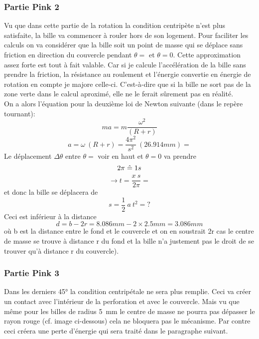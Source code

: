 \subsubsection{Partie Pink 2}
Vu que dans cette partie de la rotation la condition centripète n'est plus satisfaite, la bille va commencer à rouler hors de son logement. Pour faciliter les calculs on va considérer que la bille soit un point de masse qui se déplace sans friction en direction du couvercle pendant $\theta = $%
et $\theta = 0$. 
Cette approximation assez forte est tout à fait valable. Car si je calcule l'accélération de la bille sans prendre la friction, la résistance au roulement et l'énergie convertie en énergie de rotation en compte je majore celle-ci. C'est-à-dire que si la bille ne sort pas de la zone verte dans le calcul aproximé, elle ne le ferait sûrement pas en réalité.\\
On a alors l'équation pour la deuxième loi de Newton suivante (dans le repère tournant):
\[ma = m \frac{\omega^{2}}{(R + r)}\]
\[a = \omega \ (R + r) = \frac{4 \pi^{2}}{s^{2}} \ (26.914mm) = \]
Le déplacement $\Delta\theta$ entre $\theta =$ voir en haut et $\theta = 0$ va prendre
\[2 \pi \mathrel{\hat{=}} 1 s\]
\[\rightarrow t = \frac{x \ s}{2 \pi} = \]
et donc la bille se déplacera de 
\[s = \frac{1}{2} \ a \ t^{2} = ? \]
Ceci est inférieur à la distance 
\[d = b - 2r = 8.086mm - 2 \times 2.5mm = 3.086mm\]
où b est la distance entre le fond et le couvercle et on en soustrait 2r cas le centre de masse se trouve à distance r du fond et la bille n'a justement pas le droit de se trouver qu'à distance r du couvercle).

\subsubsection{Partie Pink 3}
Dans les derniers \ang{45} la condition centripétale ne sera plus remplie. Ceci va créer un contact avec l'intérieur de la perforation et avec le couvercle. Mais vu que même pour les billes de radius \SI{5}{\milli\metre} le centre de masse ne pourra pas dépasser le rayon rouge (cf. image ci-dessous) cela ne bloquera pas le mécanisme.
Par contre ceci créera une perte d'énergie qui sera traité dans le paragraphe suivant.

